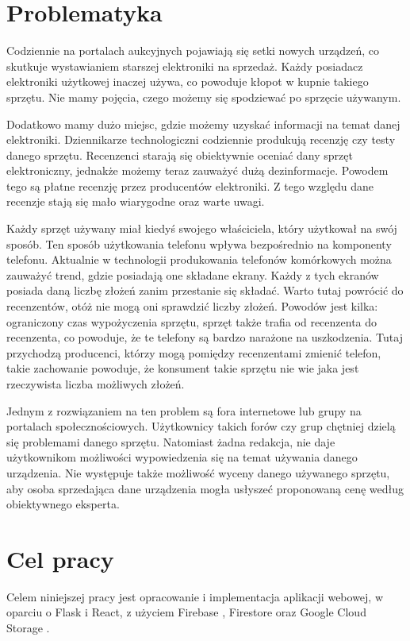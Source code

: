 \section{Problematyka}
Codziennie na portalach aukcyjnych pojawiają się setki nowych urządzeń, co skutkuje wystawianiem starszej elektroniki na sprzedaż. Każdy posiadacz elektroniki użytkowej inaczej używa, co powoduje kłopot w kupnie takiego sprzętu. Nie mamy pojęcia, czego możemy się spodziewać po sprzęcie używanym.

Dodatkowo mamy dużo miejsc, gdzie możemy uzyskać informacji na temat danej elektroniki. Dziennikarze technologiczni codziennie produkują recenzję czy testy danego sprzętu. Recenzenci starają się obiektywnie oceniać dany sprzęt elektroniczny, jednakże możemy teraz zauważyć dużą dezinformacje. Powodem tego są płatne recenzję przez producentów elektroniki. Z tego względu dane recenzje stają się mało wiarygodne oraz warte uwagi.

Każdy sprzęt używany miał kiedyś swojego właściciela, który użytkował na swój sposób. Ten sposób użytkowania telefonu wpływa bezpośrednio na komponenty telefonu. Aktualnie w technologii produkowania telefonów komórkowych można zauważyć trend, gdzie posiadają one składane ekrany. Każdy z tych ekranów posiada daną liczbę złożeń zanim przestanie się składać. Warto tutaj powrócić do recenzentów, otóż nie mogą oni sprawdzić liczby złożeń. Powodów jest kilka: ograniczony czas wypożyczenia sprzętu, sprzęt także trafia od recenzenta do recenzenta, co powoduje, że te telefony są bardzo narażone na uszkodzenia. Tutaj przychodzą producenci, którzy mogą pomiędzy recenzentami zmienić telefon, takie zachowanie powoduje, że konsument takie sprzętu nie wie jaka jest rzeczywista liczba możliwych złożeń.

Jednym z rozwiązaniem na ten problem są fora internetowe lub grupy na portalach społecznościowych. Użytkownicy takich forów czy grup chętniej dzielą się problemami danego sprzętu. Natomiast żadna redakcja, nie daje użytkownikom możliwości wypowiedzenia się na temat używania danego urządzenia. Nie występuje także możliwość wyceny danego używanego sprzętu, aby osoba sprzedająca dane urządzenia mogła usłyszeć proponowaną cenę według obiektywnego eksperta.

\section{Cel pracy}
Celem niniejszej pracy jest opracowanie i implementacja aplikacji webowej, w oparciu o Flask i React, z użyciem Firebase \cite*{firebase}, Firestore \cite*{firestore} oraz Google Cloud Storage \cite*{cloud_storage}.

